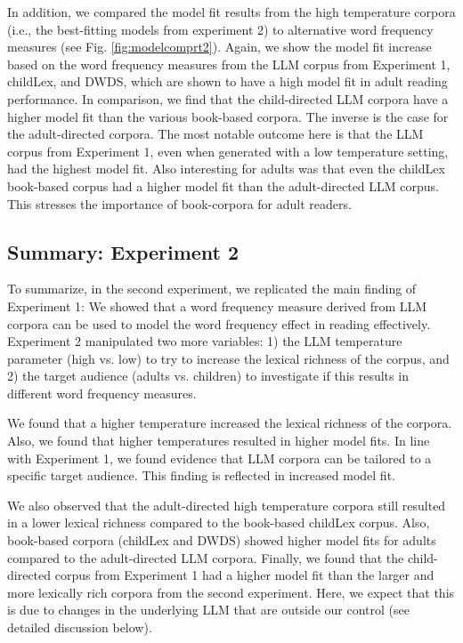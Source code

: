 \documentclass[doc, a4paper]{apa7}
\begin{document}
In addition, we compared the model fit results from the high temperature corpora (i.e., the best-fitting models from experiment 2) to alternative word frequency measures (see Fig. \ref{fig:modelcomprt2}). Again, we show the model fit increase based on the word frequency measures from the LLM corpus from Experiment 1, childLex, and DWDS, which are shown to have a high model fit in adult reading performance. In comparison, we find that the child-directed LLM corpora have a higher model fit than the various book-based corpora. The inverse is the case for the adult-directed corpora. The most notable outcome here is that the LLM corpus from Experiment 1, even when generated with a low temperature setting, had the highest model fit. Also interesting for adults was that even the childLex book-based corpus had a higher model fit than the adult-directed LLM corpus. This stresses the importance of book-corpora for adult readers.


\subsection*{Summary: Experiment 2}

To summarize, in the second experiment, we replicated the main finding of Experiment 1: We showed that a word frequency measure derived from LLM corpora can be used to model the word frequency effect in reading effectively. Experiment 2 manipulated two more variables: 1) the LLM temperature parameter (high vs. low) to try to increase the lexical richness of the corpus, and 2) the target audience (adults vs. children) to investigate if this results in different word frequency measures. 

We found that a higher temperature increased the lexical richness of the corpora. Also, we found that higher temperatures resulted in higher model fits. In line with Experiment 1, we found evidence that LLM corpora can be tailored to a specific target audience. This finding is reflected in increased model fit.

We also observed that the adult-directed high temperature corpora still resulted in a lower lexical richness compared to the book-based childLex corpus. Also, book-based corpora (childLex and DWDS) showed higher model fits for adults compared to the adult-directed LLM corpora. Finally, we found that the child-directed corpus from Experiment 1 had a higher model fit than the larger and more lexically rich corpora from the second experiment. Here, we expect that this is due to changes in the underlying LLM that are outside our control (see detailed discussion below).
\end{document}

